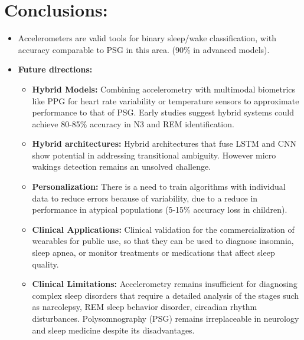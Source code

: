 \documentclass[conference]{IEEEtran}
\begin{document}
\section{Conclusions: }
    
    \begin{itemize}
		\item Accelerometers are valid tools for binary sleep/wake classification, with accuracy comparable to PSG in this area. (90\% in advanced models).
        \item \textbf{Future directions:} 
        \begin{itemize}
		      \item \textbf{Hybrid Models:} Combining accelerometry with multimodal biometrics like PPG for heart rate variability or temperature sensors to approximate performance to that of PSG. Early studies suggest hybrid systems could achieve 80-85\% accuracy in N3 and REM identification.
                \item \textbf{Hybrid architectures:} Hybrid architectures that fuse LSTM and CNN show potential in addressing transitional ambiguity. However micro wakings detection remains an unsolved challenge.
		      \item \textbf{Personalization:} There is a need to train algorithms with individual data to reduce errors because of variability, due to a reduce in performance in atypical populations (5-15\% accuracy loss in children).
                \item \textbf{Clinical Applications:} Clinical validation for the commercialization of wearables for public use, so that they can be used to diagnose insomnia, sleep apnea, or monitor treatments or medications that affect sleep quality.
                \item \textbf{Clinical Limitations:} Accelerometry remains insufficient for diagnosing complex sleep disorders that require a detailed analysis of the stages such as narcolepsy, REM sleep behavior disorder, circadian rhythm disturbances. Polysomnography (PSG) remains irreplaceable in neurology and sleep medicine despite its disadvantages.
	      \end{itemize}
	\end{itemize}
\end{document}
